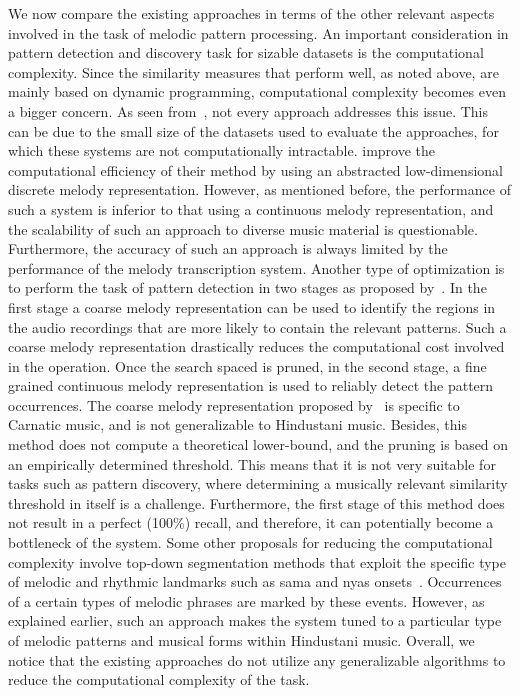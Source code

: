 We now compare the existing approaches in terms of the other relevant aspects involved in the task of melodic pattern processing. An important consideration in  pattern detection and discovery task for sizable datasets is the computational complexity. Since the similarity measures that perform well, as noted above, are mainly based on dynamic programming, computational complexity becomes even a bigger concern. As seen from~, not every approach addresses this issue. This can be due to the small size of the datasets used to evaluate the approaches, for which these systems are not computationally intractable. \cite{ganguli2015efficient} improve the computational efficiency of their method by using an abstracted low-dimensional discrete melody representation. However, as mentioned before, the performance of such a system is inferior to that using a continuous melody representation, and the scalability of such an approach to diverse music material is questionable. Furthermore, the accuracy of such an approach is always limited by the performance of the melody transcription system. Another type of optimization is to perform the task of pattern detection in two stages as proposed by~\cite{dutta2014modified,Ishwar2013}. In the first stage a coarse melody representation can be used to identify the regions in the audio recordings that are more likely to contain the relevant patterns. Such a coarse melody representation drastically reduces the computational cost involved in the operation. Once the search spaced is pruned, in the second stage, a fine grained continuous melody representation is used to reliably detect the pattern occurrences. The coarse melody representation proposed by~\cite{Ishwar2013} is specific to Carnatic music, and is not generalizable to Hindustani music. Besides, this method does not compute a theoretical lower-bound, and the pruning is based on an empirically determined threshold. This means that it is not very suitable for tasks such as pattern discovery, where determining a musically relevant similarity threshold in itself is a challenge. Furthermore, the first stage of this method does not result in a perfect (100\%) recall, and therefore, it can potentially become a bottleneck of the system. Some other proposals for reducing the computational complexity involve top-down segmentation methods that exploit the specific type of melodic and rhythmic landmarks such as \gls{sama} and \gls{nyas} onsets~\citep{Ross2012,Ross2012b}. Occurrences of a certain types of melodic phrases are marked by these events. However, as explained earlier, such an approach makes the system tuned to a particular type of melodic patterns and musical forms within Hindustani music. Overall, we notice that the existing approaches do not utilize any generalizable algorithms to reduce the computational complexity of the task. 

